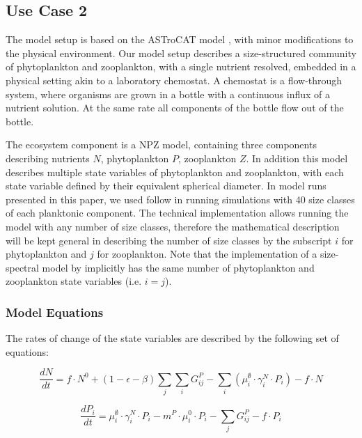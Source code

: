 \documentclass[template.tex]{subfiles}
\begin{document}
\subsection{Use Case 2}
The model setup is based on the ASTroCAT model \citep{Banas2011b}, with minor modifications to the physical environment. 
Our model setup describes a size-structured community of phytoplankton and zooplankton, with a single nutrient resolved, embedded in a physical setting akin to a laboratory chemostat.
A chemostat is a flow-through system, where organisms are grown in a bottle with a continuous influx of a nutrient solution. At the same rate all components of the bottle flow out of the bottle.

The ecosystem component is a NPZ model, containing three components describing nutrients $N$, phytoplankton $P$, zooplankton $Z$. In addition this model describes multiple state variables of phytoplankton and zooplankton, with each state variable defined by their equivalent spherical diameter.
In model runs presented in this paper, we used follow \citet{Banas2011b} in running simulations with 40 size classes of each planktonic component. 
The technical implementation allows running the model with any number of size classes, therefore the mathematical description will be kept general in describing the number of size classes by the subscript $i$ for phytoplankton and $j$ for zooplankton. Note that the implementation of a size-spectral model by \citeauthor{Banas2011b} implicitly has the same number of phytoplankton and zooplankton state variables (i.e. $i = j$).



\subsubsection{Model Equations}
The rates of change of the state variables are described by the following set of equations:

\begin{equation}
    \frac{d N}{d t} = 
    f \cdot N^0 %
    + (1 - \epsilon - \beta)\sum_{j} \sum_{i} G_{ij}^P %
    - \sum_{i} ( \mu_i^{\emptyset} \cdot \gamma_i^N \cdot P_i) %
    - f \cdot N
\end{equation}

\begin{equation}
    \frac{d P_i}{d t} =
    \mu_i^{\emptyset} \cdot  \gamma_i^N \cdot   P_i  %
    - m^P  \cdot \mu_i^{0} \cdot P_i %
    - \sum_{j} G_{ij}^P %
    - f \cdot P_i
\end{equation}
\end{document}

